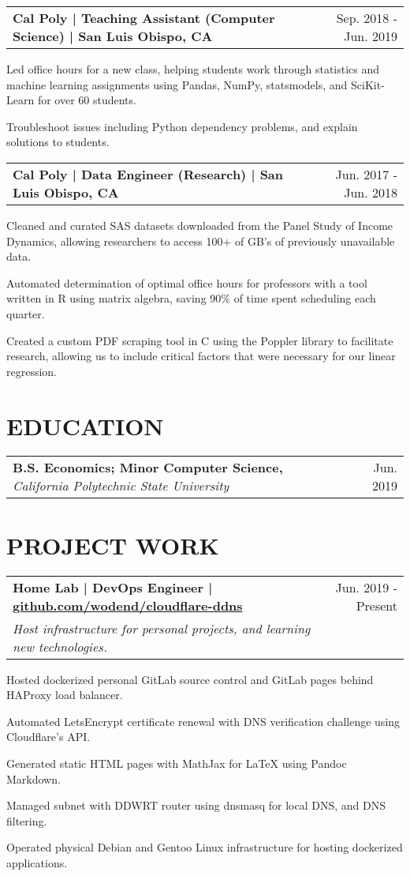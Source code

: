 \documentclass{article}
\makeatletter
\newcommand{\beginResumeList}{\begin{itemize}\setlength\itemsep{0em}\begin{minipage}{0.9\textwidth}}
\newcommand{\resumeListEnd}{\end{minipage}\end{itemize}}
\newcommand{\normalItem}[1]{\normalsize\item{#1}}
\newcommand{\experience}[2]{
  \begin{tabular*}{\textwidth}[t]{l@{\extracolsep{\fill}}r}
    \normalsize\textbf{#1} & \normalsize #2 \\
  \end{tabular*}
}
\newcommand{\education}[3]{
  \begin{tabular*}{\textwidth}[t]{l@{\extracolsep{\fill}}r}
    \normalsize\textbf{#1, }\textit{#2} & \normalsize #3 \\
  \end{tabular*}\vspace{-10pt}
}
\newcommand{\project}[3]{
  \begin{tabular*}{\textwidth}[t]{l@{\extracolsep{\fill}}r}
    \normalsize\textbf{#1} & \normalsize{#2} \\
    \normalsize\textit{#3}
  \end{tabular*}
}
\makeatother
\begin{document}
  \experience
    {Cal Poly | Teaching Assistant (Computer Science) | San Luis Obispo, CA}
    {Sep. 2018 - Jun. 2019}
    \beginResumeList
      \normalItem{Led office hours for a new class, helping students work through statistics and machine learning assignments using Pandas, NumPy, statsmodels, and SciKit-Learn for over 60 students.}
      \normalItem{Troubleshoot issues including Python dependency problems, and explain solutions to students.}
    \resumeListEnd

  \experience
    {Cal Poly | Data Engineer (Research) | San Luis Obispo, CA}
    {Jun. 2017 - Jun. 2018}
    \beginResumeList
      \normalItem{Cleaned and curated SAS datasets downloaded from the Panel Study of Income Dynamics, allowing researchers to access 100+ of GB's of previously unavailable data.}
      \normalItem{Automated determination of optimal office hours for professors with a tool written in R using matrix algebra, saving 90\% of time spent scheduling each quarter.}
      \normalItem{Created a custom PDF scraping tool in C using the Poppler library to facilitate research, allowing us to include critical factors that were necessary for our linear regression.}
    \resumeListEnd

\section{EDUCATION}
  \education
    {B.S. Economics; Minor Computer Science}
    {California Polytechnic State University}
    {Jun. 2019}

\section{PROJECT WORK}

  \project
    {Home Lab | DevOps Engineer | \href{https://github.com/wodend/cloudflare-ddns}{github.com/wodend/cloudflare-ddns}}
    {Jun. 2019 - Present}
    {Host infrastructure for personal projects, and learning new technologies.}
    \beginResumeList
      \normalItem{Hosted dockerized personal GitLab source control and GitLab pages behind HAProxy load balancer.}
      \normalItem{Automated LetsEncrypt certificate renewal with DNS verification challenge using Cloudflare's API.}
      \normalItem{Generated static HTML pages with MathJax for LaTeX using Pandoc Markdown.}
      \normalItem{Managed subnet with DDWRT router using dnsmasq for local DNS, and DNS filtering.}
      \normalItem{Operated physical Debian and Gentoo Linux infrastructure for hosting dockerized applications.}
    \resumeListEnd
\end{document}
